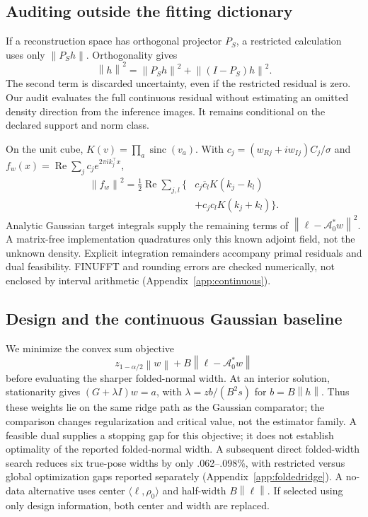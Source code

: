 \documentclass{article}
\newcommand{\norm}[1]{\left\|#1\right\|}
\newcommand{\ip}[2]{\langle #1,#2\rangle}
\newcommand{\A}{\mathcal A}
\begin{document}
\subsection{Auditing outside the fitting dictionary}
If a reconstruction space has orthogonal projector $P_S$, a restricted calculation uses only $\norm{P_Sh}$. Orthogonality gives
\begin{equation}\label{eq:omission}
\norm h^2=\norm{P_Sh}^2+\norm{(I-P_S)h}^2.
\end{equation}
The second term is discarded uncertainty, even if the restricted residual is zero. Our audit evaluates the full continuous residual without estimating an omitted density direction from the inference images. It remains conditional on the declared support and norm class.

On the unit cube, $K(v)=\prod_a\operatorname{sinc}(v_a)$. With $c_j=(w_{Rj}+iw_{Ij})C_j/\sigma$ and $f_w(x)=\operatorname{Re}\sum_j c_je^{2\pi i k_j^\top x}$,
\begin{align}\label{eq:sincgram}
\norm{f_w}^2=\tfrac12\operatorname{Re}\sum_{j,l}\{&c_j\overline c_l K(k_j-k_l)\nonumber\\
&+c_jc_lK(k_j+k_l)\}.
\end{align}
Analytic Gaussian target integrals supply the remaining terms of $\norm{\ell-\A_0^*w}^2$. A matrix-free implementation quadratures only this known adjoint field, not the unknown density. Explicit integration remainders accompany primal residuals and dual feasibility. FINUFFT and rounding errors are checked numerically, not enclosed by interval arithmetic (Appendix~\ref{app:continuous}).

\subsection{Design and the continuous Gaussian baseline}
We minimize the convex sum objective
\begin{equation}\label{eq:sumobjective}
z_{1-\alpha/2}\norm w+B\norm{\ell-\A_0^*w}
\end{equation}
before evaluating the sharper folded-normal width. At an interior solution, stationarity gives $(G+\lambda I)w=a$, with $\lambda=zb/(B^2s)$ for $b=B\norm h$. Thus these weights lie on the same ridge path as the Gaussian comparator; the comparison changes regularization and critical value, not the estimator family. A feasible dual supplies a stopping gap for this objective; it does not establish optimality of the reported folded-normal width. A subsequent direct folded-width search reduces six true-pose widths by only .062--.098\%, with restricted versus global optimization gaps reported separately (Appendix~\ref{app:foldedridge}). A no-data alternative uses center $\ip{\ell}{\rho_0}$ and half-width $B\norm\ell$. If selected using only design information, both center and width are replaced.
\end{document}

